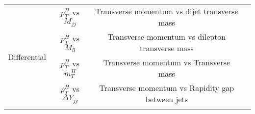 \begin{table}[]
\begin{tabular}{clll}
\multicolumn{1}{|c|}{\multirow{5}{*}{Differential}} & \multicolumn{1}{c|}{$p_{T}^{H}$ vs $M_{jj}$}        & \multicolumn{1}{c|}{Transverse momentum vs dijet transverse mass}     &  \\ \cline{2-3}
\multicolumn{1}{|c|}{}                              & \multicolumn{1}{c|}{$p_{T}^{H}$ vs $M_{ll}$}        & \multicolumn{1}{c|}{Transverse momentum vs dilepton transverse mass}  &  \\ \cline{2-3}
\multicolumn{1}{|c|}{}                              & \multicolumn{1}{c|}{$p_{T}^{H}$ vs $m_{T}^{H}$}     & \multicolumn{1}{c|}{Transverse momentum vs Transverse mass }          &  \\ \cline{2-3}
\multicolumn{1}{|c|}{}                              & \multicolumn{1}{c|}{$p_{T}^{H}$ vs $\Delta Y_{jj}$} & \multicolumn{1}{c|}{Transverse momentum vs Rapidity gap between jets} &  \\ \cline{1-3}
\multicolumn{1}{l}{}                                &                                    &                                                                       & 
\end{tabular}
\end{table}























